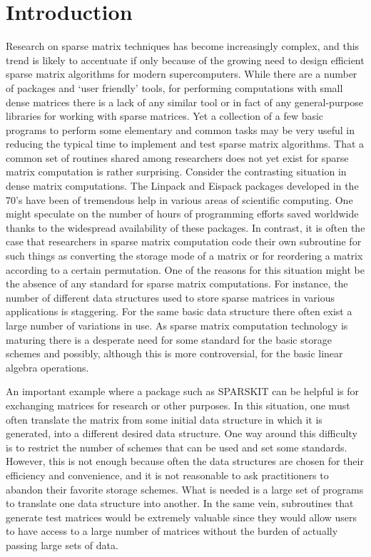 \newpage

\section{Introduction} Research   on   sparse  matrix   techniques  has  become
increasingly complex, and this trend is likely to accentuate if only
because  of the growing need 
to design efficient sparse matrix algorithms for modern supercomputers.   
While there  are a  number of packages and `user
friendly' tools, for  performing computations  with small dense
matrices there is a lack of any similar tool or in fact of any 
general-purpose libraries for 
working with sparse  matrices.   Yet a  collection of  a few  basic programs to
perform some elementary and  common tasks  may be  very useful  in reducing the
typical time to implement and test sparse matrix algorithms.   That a common 
set
of routines  shared  among  researchers  does not  yet exist for sparse matrix
computation is rather surprising.  Consider the contrasting  situation in dense
matrix computations.  The Linpack  and Eispack  packages developed  in the 70's
have been of tremendous  help in  various areas  of scientific  computing.  
One might speculate on the number of hours of programming efforts 
saved worldwide thanks to the widespread availability  of these  packages.
In contrast,  it is  often the case that  researchers in  sparse  matrix 
computation  
code their own subroutine for  such  things as converting the storage mode
of a matrix or for reordering a matrix
according to a certain permutation.  One of the  reasons for this situation
might be the absence of any standard for sparse
matrix computations.  For instance, the number of different data
structures used to store sparse matrices in various applications is
staggering.  For the same basic data structure there often exist a
large number of variations in use.  As sparse matrix computation
technology is maturing there is a desperate need for some standard for
the basic storage schemes and possibly, although this is more
controversial, for the basic linear algebra operations.  

An important example where a package such as SPARSKIT can be helpful is for
exchanging matrices for research or other purposes.  In this
situation, one must often translate the matrix from some initial data
structure in which it is generated, into a different desired data
structure.  One way around this difficulty is to restrict 
the number of schemes that can be used and set  some standards.
 However, this is not
enough because often the data structures are chosen for their
efficiency and convenience, and it is not reasonable to ask
practitioners to abandon their favorite storage schemes.  What is
needed is a large set of programs to translate one data structure into
another. In the same vein, subroutines that generate test matrices
would be extremely valuable since they would allow users to have
access to a large number of matrices without the burden of actually
passing large sets of data.

